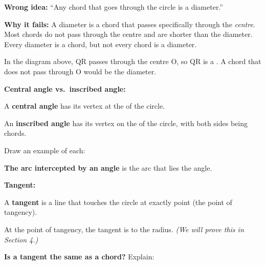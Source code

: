 \documentclass[11pt, a4paper]{article}
\newcommand{\blank}[1]{\underline{\hspace{#1}}}
\begin{document}
\begin{tcolorbox}[misconc]
\textbf{Wrong idea:} ``Any chord that goes through the circle is a diameter.''

\smallskip
\textbf{Why it fails:} A diameter is a chord that passes specifically through the \textit{centre}. Most chords do not pass through the centre and are shorter than the diameter. Every diameter is a chord, but not every chord is a diameter.

\smallskip
In the diagram above, QR passes through the centre O, so QR is a \blank{3cm}.\newline
A chord that does not pass through O would be \blank{3cm} the diameter.
\end{tcolorbox}

\textbf{Central angle vs.\ inscribed angle:}

A \textbf{central angle} has its vertex at the \blank{3.5cm} of the circle.

An \textbf{inscribed angle} has its vertex on the \blank{3.5cm} of the circle, with both sides being chords.

Draw an example of each:

\begin{center}
\end{center}

\textbf{The arc intercepted by an angle} is the arc that lies \blank{5cm} the angle.

\vspace{6pt}
\textbf{Tangent:}

A \textbf{tangent} is a line that touches the circle at exactly \blank{2cm} point (the point of tangency).

At the point of tangency, the tangent is \blank{3.5cm} to the radius. \textit{(We will prove this in Section 4.)}

\textbf{Is a tangent the same as a chord?} \blank{1cm}\quad Explain: \blank{6.5cm}
\end{document}
